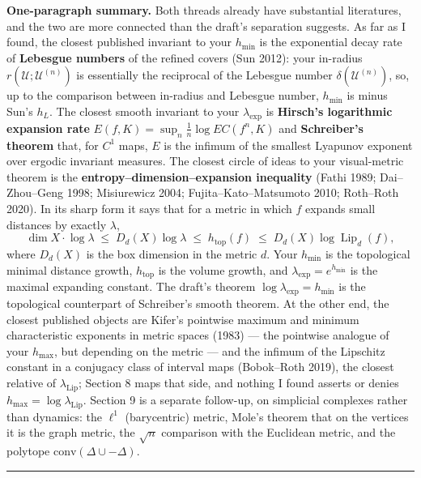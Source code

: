 \documentclass[
]{article}
\begin{document}
\textbf{One-paragraph summary.} Both threads already have substantial
literatures, and the two are more connected than the draft's separation
suggests. As far as I found, the closest published invariant to your
\(h_{\min}\) is the exponential decay rate of \textbf{Lebesgue numbers}
of the refined covers (Sun 2012): your in-radius
\(r(\mathcal U;\mathcal U^{(n)})\) is essentially the reciprocal of the
Lebesgue number \(\delta(\mathcal U^{(n)})\), so, up to the comparison
between in-radius and Lebesgue number, \(h_{\min}\) is minus Sun's
\(h_L\). The closest smooth invariant to your \(\lambda_{\exp}\) is
\textbf{Hirsch's logarithmic expansion rate}
\(E(f,K)=\sup_n \frac1n\log EC(f^n,K)\) and \textbf{Schreiber's theorem}
that, for \(C^1\) maps, \(E\) is the infimum of the smallest Lyapunov
exponent over ergodic invariant measures. The closest circle of ideas to
your visual-metric theorem is the \textbf{entropy--dimension--expansion
inequality} (Fathi 1989; Dai--Zhou--Geng 1998; Misiurewicz 2004;
Fujita--Kato--Matsumoto 2010; Roth--Roth 2020). In its sharp form it
says that for a metric in which \(f\) expands small distances by exactly
\(\lambda\), \[
\dim X\cdot\log\lambda \;\le\; D_d(X)\log\lambda \;\le\; h_{\mathrm{top}}(f) \;\le\; D_d(X)\log\operatorname{Lip}_d(f),
\] where \(D_d(X)\) is the box dimension in the metric \(d\). Your
\(h_{\min}\) is the topological minimal distance growth,
\(h_{\mathrm{top}}\) is the volume growth, and
\(\lambda_{\exp}=e^{h_{\min}}\) is the maximal expanding constant. The
draft's theorem \(\log\lambda_{\exp}=h_{\min}\) is the topological
counterpart of Schreiber's smooth theorem. At the other end, the closest
published objects are Kifer's pointwise maximum and minimum
characteristic exponents in metric spaces (1983) --- the pointwise
analogue of your \(h_{\max}\), but depending on the metric --- and the
infimum of the Lipschitz constant in a conjugacy class of interval maps
(Bobok--Roth 2019), the closest relative of \(\lambda_{\mathrm{Lip}}\);
Section 8 maps that side, and nothing I found asserts or denies
\(h_{\max}=\log\lambda_{\mathrm{Lip}}\). Section 9 is a separate
follow-up, on simplicial complexes rather than dynamics: the \(\ell^1\)
(barycentric) metric, Mole's theorem that on the vertices it is the
graph metric, the \(\sqrt n\) comparison with the Euclidean metric, and
the polytope \(\mathrm{conv}(\Delta\cup-\Delta)\).

\begin{center}\rule{0.5\linewidth}{0.5pt}\end{center}
\end{document}
